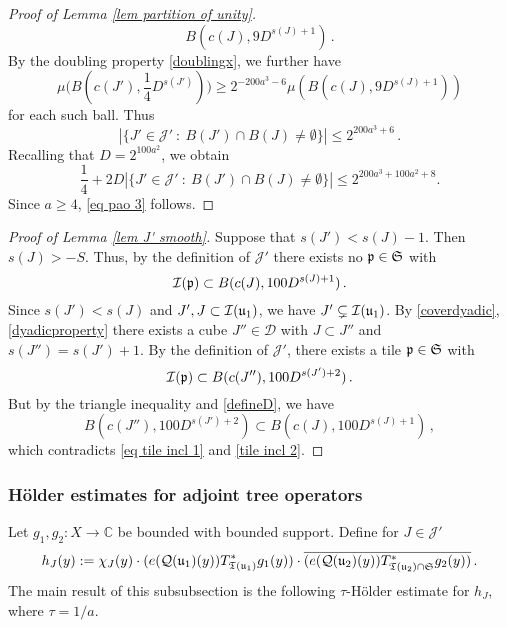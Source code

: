 {\begin{proof}[Proof of Lemma \ref{lem partition of unity}]
        $$
            B(c(J), 9 D^{s(J) + 1})\,.
        $$
        By the doubling property \eqref{doublingx}, we further have
        $$
            \mu\Big(B(c(J'), \frac{1}{4}D^{s(J')})\Big) \ge 2^{-200a^3 - 6} \mu(B(c(J), 9 D^{s(J) + 1}))
        $$
        for each such ball.
        Thus
        $$
            |\{J' \in \mathcal{J}' \ : \  B(J') \cap B(J) \ne \emptyset\}| \le 2^{200a^3 + 6}\,.
        $$
        Recalling that $D=2^{100a^2}$, we obtain
        $$\frac{1}{4} + 2D |\{J' \in \mathcal{J}' \ : \  B(J') \cap B(J) \ne \emptyset\}|\leq 2^{200a^3 + 100a^2+ 8}.$$
        Since $a\ge 4$, \eqref{eq pao 3} follows.
    \end{proof}

    \begin{proof}[Proof of Lemma \ref{lem J' smooth}]
        Suppose that $s(J') < s(J) - 1$. Then $s(J) > -S$. Thus, by the definition of $\mathcal{J}'$ there exists no $\mathfrak p \in \mathfrak{S}$ with
        \begin{equation}
            \label{eq tile incl 1}
            \mathcal{I}(\mathfrak p) \subset B(c(J), 100D^{s(J) + 1})\,.
        \end{equation}
        Since $s(J') < s(J)$ and $J', J \subset \mathcal{I}(\mathfrak u_1)$, we have $J' \subsetneq \mathcal{I}(\mathfrak u_1)$.
        By \eqref{coverdyadic}, \eqref{dyadicproperty} there exists a cube $J'' \in \mathcal{D}$ with $J \subset J''$ and $s(J'') = s(J') + 1$. By the definition of $\mathcal{J}'$, there exists a tile $\mathfrak p \in \mathfrak{S}$ with
        \begin{equation}
            \label{tile incl 2}
            \mathcal{I}(\mathfrak p) \subset B(c(J''), 100 D^{s(J')+2})\,.
        \end{equation}
        But by the triangle inequality and \eqref{defineD}, we have
        $$
            B(c(J''), 100 D^{s(J')+2}) \subset B(c(J), 100D^{s(J) + 1})\,,
        $$
        which contradicts \eqref{eq tile incl 1} and \eqref{tile incl 2}.
    \end{proof}


\subsubsection{Hölder estimates for adjoint tree operators}
\label{subsubsec holder estimates}
    Let $g_1, g_2:X \to \mathbb{C}$  be bounded with bounded support.
    Define for $J \in \mathcal{J}'$
    \begin{equation}
        \label{def hj}
        h_J(y) := \chi_J(y)\cdot(e(\mathcal{Q}(\mathfrak u_1)(y)) T_{\mathfrak T(\mathfrak u_1)}^* g_1(y)) \cdot \overline{(e(\mathcal{Q}(\mathfrak u_2)(y)) T_{\mathfrak T(\mathfrak u_2) \cap \mathfrak{S}}^* g_2(y))}\,.
    \end{equation}
    The main result of this subsubsection is the following $\tau$-Hölder estimate for $h_J$, where $\tau = 1/a$.

}
